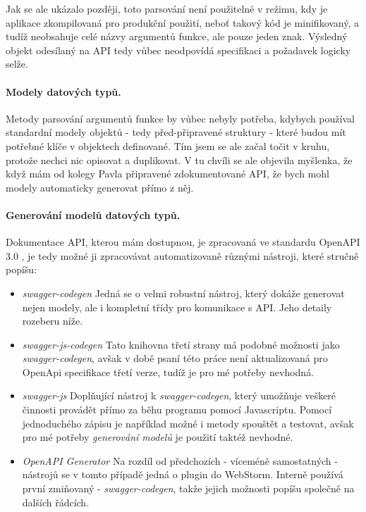 Jak se ale ukázalo později, toto parsování není použitelné v režimu, kdy je aplikace zkompilovaná pro produkční použití, neboť takový kód je minifikovaný, a tudíž neobsahuje celé názvy argumentů funkce, ale pouze jeden znak. Výsledný objekt odesílaný na API tedy vůbec neodpovídá specifikaci a požadavek logicky selže.

\paragraph{Modely datových typů.} Metody parsování argumentů funkce by vůbec nebyly potřeba, kdybych používal standardní modely objektů - tedy před-připravené struktury - které budou mít potřebné klíče v objektech definované. Tím jsem se ale začal točit v kruhu, protože nechci nic opisovat a duplikovat. V tu chvíli se ale objevila myšlenka, že když mám od kolegy Pavla připravené zdokumentované API, že bych mohl modely automaticky generovat přímo z něj.

\paragraph{Generování modelů datových typů.} Dokumentace API, kterou mám dostupnou, je zpracovaná ve standardu OpenAPI 3.0 \cite{openapi-spec}, je tedy možné ji zpracovávat automatizovaně různými nástroji, které stručně popíšu:

\begin{itemize}
    \item \emph{swagger-codegen} \cite{swagger-codegen} Jedná se o velmi robustní nástroj, který dokáže generovat nejen modely, ale i kompletní třídy pro komunikace s API. Jeho detaily rozeberu níže.
    \item \emph{swagger-js-codegen} \cite{swagger-js-codegen} Tato knihovna třetí strany má podobné možnosti jako \emph{swagger-codegen}, avšak v době psaní této práce není aktualizovaná pro OpenApi specifikace třetí verze, tudíž je pro mé potřeby nevhodná.
    \item \emph{swagger-js} \cite{swagger-js} Doplňující nástroj k \emph{swagger-codegen}, který umožňuje veškeré činnosti provádět přímo za běhu programu pomocí Javascriptu. Pomocí jednoduchého zápisu je například možné i metody spouštět a testovat, avšak pro mé potřeby \emph{generování modelů} je použití taktéž nevhodné.
    \item \emph{OpenAPI Generator} \cite{openapi-generator} Na rozdíl od předchozích - víceméně samostatných - nástrojů se v tomto případě jedná o plugin do WebStorm. Interně používá první zmiňovaný - \emph{swagger-codegen}, takže jejich možnosti popíšu společně na dalších řádcích.
\end{itemize}

